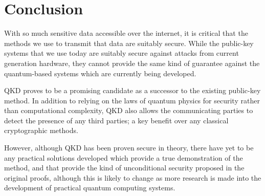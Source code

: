 \documentclass[runningheads,a4paper]{llncs}
\begin{document}
\section{Conclusion}

With so much sensitive data accessible over the internet, it is critical that the methods we use to transmit that data are suitably secure. While the public-key systems that we use today are suitably secure against attacks from current generation hardware, they cannot provide the same kind of guarantee against the quantum-based systems which are currently being developed.

QKD proves to be a promising candidate as a successor to the existing public-key method. In addition to relying on the laws of quantum physics for security rather than computational complexity, QKD also allows the communicating parties to detect the presence of any third parties; a key benefit over any classical cryptographic methods.

However, although QKD has been proven secure in theory, there have yet to be any practical solutions developed which provide a true demonstration of the method, and that provide the kind of unconditional security proposed in the original proofs, although this is likely to change as more research is made into the development of practical quantum computing systems.



\end{document}
